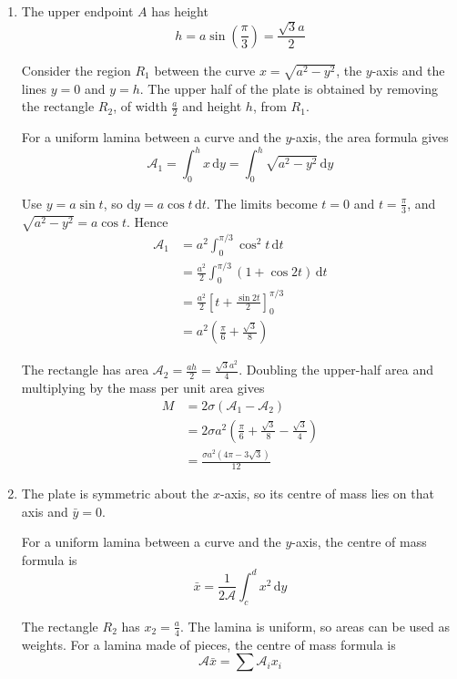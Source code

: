 \documentclass[leqno]{article}
\begin{document}
\begin{enumerate}[
  label=\textbf{\arabic*.},
  leftmargin=*,
  topsep=0pt,
  partopsep=0pt,
  parsep=0pt
]
\vspace*{10pt}

\begin{djsSolution}
\begin{enumerate}[label=\textbf{(\alph*)}, start=1]
\item
The upper endpoint \(A\) has height
\[
h=a\sin\left(\frac{\pi}{3}\right)=\frac{\sqrt{3}a}{2}
\]

Consider the region \(R_1\) between the curve \(x=\sqrt{a^2-y^2}\), the \(y\)-axis and the lines \(y=0\) and \(y=h\). The upper half of the plate is obtained by removing the rectangle \(R_2\), of width \(\frac{a}{2}\) and height \(h\), from \(R_1\).

For a uniform lamina between a curve and the \(y\)-axis, the area formula gives
\[
\mathcal A_1=\int_0^h x\,\mathrm{d}y
=\int_0^h\sqrt{a^2-y^2}\,\mathrm{d}y
\]

Use \(y=a\sin t\), so \(\mathrm{d}y=a\cos t\,\mathrm{d}t\). The limits become \(t=0\) and \(t=\frac{\pi}{3}\), and \(\sqrt{a^2-y^2}=a\cos t\). Hence
\begin{align*}
\mathcal A_1
&=a^2\int_0^{\pi/3}\cos^2t\,\mathrm{d}t\\
&=\frac{a^2}{2}\int_0^{\pi/3}(1+\cos 2t)\,\mathrm{d}t\\
&=\frac{a^2}{2}\left[t+\frac{\sin 2t}{2}\right]_0^{\pi/3}\\
&=a^2\left(\frac{\pi}{6}+\frac{\sqrt{3}}{8}\right)
\end{align*}

The rectangle has area \(\mathcal A_2=\frac{ah}{2}=\frac{\sqrt{3}a^2}{4}\). Doubling the upper-half area and multiplying by the mass per unit area gives
\begin{align*}
M&=2\sigma(\mathcal A_1-\mathcal A_2)\\
&=2\sigma a^2\left(\frac{\pi}{6}+\frac{\sqrt{3}}{8}-\frac{\sqrt{3}}{4}\right)\\
&=\frac{\sigma a^2(4\pi-3\sqrt{3})}{12}
\end{align*}

\item
The plate is symmetric about the \(x\)-axis, so its centre of mass lies on that axis and \(\bar y=0\).

For a uniform lamina between a curve and the \(y\)-axis, the centre of mass formula is
\[
\bar{x}=\frac{1}{2\mathcal{A}}\int_c^d x^2\,\mathrm{d}y
\]

The rectangle \(R_2\) has \(x_2=\frac{a}{4}\). The lamina is uniform, so areas can be used as weights. For a lamina made of pieces, the centre of mass formula is
\[
\mathcal{A}\bar{x}=\sum\mathcal{A}_ix_i
\]


\end{enumerate}
\end{djsSolution}
\end{enumerate}
\end{document}
